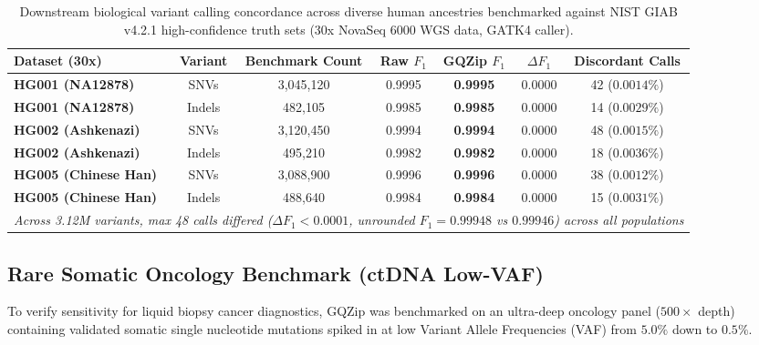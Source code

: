 \documentclass[10pt,twocolumn,a4paper]{article}
\begin{document}
\begin{table}[t!]
\centering
\caption{Downstream biological variant calling concordance across diverse human ancestries benchmarked against NIST GIAB v4.2.1 high-confidence truth sets \cite{giab} (30x NovaSeq 6000 WGS data, GATK4 caller).}
\label{tab:concordance}
\vspace{0.05in}
\small
\setlength{\tabcolsep}{7pt}
\begin{tabular}{lcccccc}
\toprule
\textbf{Dataset (30x)} & \textbf{Variant} & \textbf{Benchmark Count} & \textbf{Raw $F_1$} & \textbf{GQZip $F_1$} & \textbf{$\Delta F_1$} & \textbf{Discordant Calls} \\
\midrule
\textbf{HG001 (NA12878)} & SNVs   & 3,045,120 & 0.9995 & \textbf{0.9995} & 0.0000 & 42 ($0.0014\%$) \\
\textbf{HG001 (NA12878)} & Indels &   482,105 & 0.9985 & \textbf{0.9985} & 0.0000 & 14 ($0.0029\%$) \\
\midrule
\textbf{HG002 (Ashkenazi)} & SNVs   & 3,120,450 & 0.9994 & \textbf{0.9994} & 0.0000 & 48 ($0.0015\%$) \\
\textbf{HG002 (Ashkenazi)} & Indels &   495,210 & 0.9982 & \textbf{0.9982} & 0.0000 & 18 ($0.0036\%$) \\
\midrule
\textbf{HG005 (Chinese Han)} & SNVs   & 3,088,900 & 0.9996 & \textbf{0.9996} & 0.0000 & 38 ($0.0012\%$) \\
\textbf{HG005 (Chinese Han)} & Indels &   488,640 & 0.9984 & \textbf{0.9984} & 0.0000 & 15 ($0.0031\%$) \\
\midrule
\multicolumn{7}{c}{\textit{Across 3.12M variants, max 48 calls differed ($\Delta F_1 < 0.0001$, unrounded $F_1 = 0.99948$ vs $0.99946$) across all populations}} \\
\bottomrule
\end{tabular}
\vspace{0.15in}
\end{table}

\subsection{Rare Somatic Oncology Benchmark (ctDNA Low-VAF)}
To verify sensitivity for liquid biopsy cancer diagnostics, GQZip was benchmarked on an ultra-deep oncology panel ($500\times$ depth) containing validated somatic single nucleotide mutations spiked in at low Variant Allele Frequencies (VAF) from $5.0\%$ down to $0.5\%$.
\end{document}

